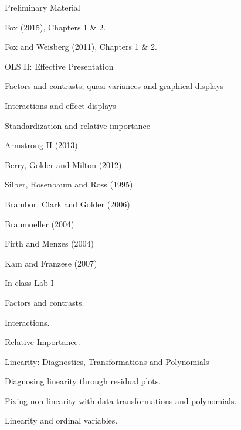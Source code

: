 \documentclass[letterpaper]{article}
\renewenvironment{itemize}{
  \begin{list}{}{
    \setlength{\leftmargin}{1.5em}
  }
}{
  \end{list}
}
\begin{document}
\begin{enumerate}


	\item Preliminary Material

		\begin{itemize}
			\item[$\star$] Fox (2015), Chapters 1 \& 2.
			\item[$\star$] Fox and Weisberg (2011), Chapters 1 \& 2.
		\end{itemize}


	\item OLS II: Effective Presentation

		\begin{itemize}
			\item[$\square$] Factors and contrasts; quasi-variances and graphical displays 
			\item[$\square$] Interactions and effect displays
			\item[$\square$] Standardization and relative importance
		\end{itemize}


		\begin{itemize}
			\item[$\star$] Armstrong II (2013)
			\item[$\star$] Berry, Golder and Milton (2012)
			\item[$\star$] Silber, Rosenbaum and Ross (1995) 
			\item[-] Brambor, Clark and Golder (2006) 
			\item[-] Braumoeller (2004)
			\item[-] Firth and Menzes (2004)
			\item[-] Kam and Franzese (2007)

		\end{itemize}

	
	\item In-class Lab I

			\begin{itemize}
				\item[$\square$] Factors and contrasts.
				\item[$\square$] Interactions.
				\item[$\square$] Relative Importance.
			\end{itemize}

	\item Linearity: Diagnostics, Transformations and Polynomials 

			\begin{itemize}
				\item[$\square$] Diagnosing linearity through residual plots.
				\item[$\square$] Fixing non-linearity with data transformations and polynomials.
				\item[$\square$] Linearity and ordinal variables.
			\end{itemize}



\end{enumerate}
\end{document}
